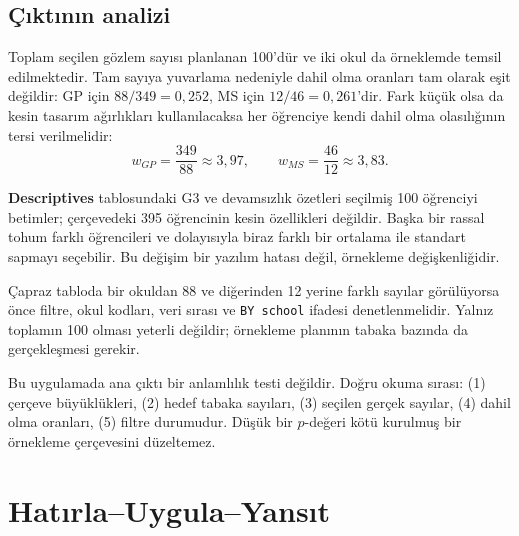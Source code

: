\subsection{Çıktının analizi}

Toplam seçilen gözlem sayısı planlanan 100'dür ve iki okul da örneklemde
temsil edilmektedir. Tam sayıya yuvarlama nedeniyle dahil olma oranları tam
olarak eşit değildir: GP için $88/349=0{,}252$, MS için
$12/46=0{,}261$'dir. Fark küçük olsa da kesin tasarım ağırlıkları kullanılacaksa
her öğrenciye kendi dahil olma olasılığının tersi verilmelidir:
\[
w_{GP}=\frac{349}{88}\approx3{,}97,
\qquad
w_{MS}=\frac{46}{12}\approx3{,}83.
\]

\textbf{Descriptives} tablosundaki G3 ve devamsızlık özetleri seçilmiş 100
öğrenciyi betimler; çerçevedeki 395 öğrencinin kesin özellikleri değildir.
Başka bir rassal tohum farklı öğrencileri ve dolayısıyla biraz farklı bir
ortalama ile standart sapmayı seçebilir. Bu değişim bir yazılım hatası değil,
örnekleme değişkenliğidir.

Çapraz tabloda bir okuldan 88 ve diğerinden 12 yerine farklı sayılar
görülüyorsa önce filtre, okul kodları, veri sırası ve \texttt{BY school}
ifadesi denetlenmelidir. Yalnız toplamın 100 olması yeterli değildir; örnekleme
planının tabaka bazında da gerçekleşmesi gerekir.

\begin{outputguidebox}
Bu uygulamada ana çıktı bir anlamlılık testi değildir. Doğru okuma sırası:
(1) çerçeve büyüklükleri, (2) hedef tabaka sayıları, (3) seçilen gerçek
sayılar, (4) dahil olma oranları, (5) filtre durumudur. Düşük bir $p$-değeri
kötü kurulmuş bir örnekleme çerçevesini düzeltemez.
\end{outputguidebox}





\section*{Hatırla--Uygula--Yansıt}

